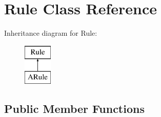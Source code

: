 \hypertarget{class_d_t_r_1_1_rule}{}\section{Rule Class Reference}
\label{class_d_t_r_1_1_rule}
Inheritance diagram for Rule\+:\begin{figure}[H]
\begin{center}
\leavevmode
\includegraphics[height=2.000000cm]{class_d_t_r_1_1_rule}
\end{center}
\end{figure}
\subsection*{Public Member Functions}
